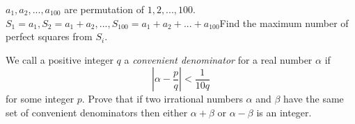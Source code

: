 \documentclass[problems.tex]{subfile}
\begin{document}
	
	
	
	\begin{problem}
		$a_1,a_2,...,a_{100}$ are permutation of $1,2,...,100$. $S_1=a_1, S_2=a_1+a_2,...,S_{100}=a_1+a_2+...+a_{100}$Find the maximum number of perfect squares from $S_i$. %
	\end{problem}
	
	
	
	
	\begin{problem}
		We call a positive integer $q$ a \textit{convenient denominator} for a real number $\alpha$ if
		$$\displaystyle \left|\alpha - \dfrac{p}{q}\right|<\dfrac{1}{10q}$$ for some integer $p$. Prove that if two irrational numbers $\alpha$ and
		$\beta$ have the same set of convenient denominators then either $\alpha+\beta$ or $\alpha- \beta$ is an integer. %
	\end{problem}
	
	
\end{document}
